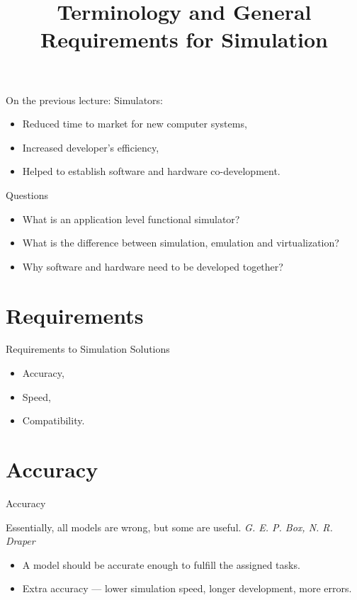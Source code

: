 

\title{Terminology and General Requirements for Simulation}



\startslides

\begin{frame}{On the previous lecture:}
Simulators:
\begin{itemize}
\item Reduced time to market for new computer systems,
\item Increased developer's efficiency,
\item Helped to establish software and hardware co-development.
\end{itemize}
\end{frame}

\begin{frame}{Questions}
\begin{itemize}
\item What is an application level functional simulator?\pause
\item What is the difference between simulation, emulation and virtualization?\pause
\item Why software and hardware need to be developed together?
\end{itemize}
\end{frame}

\section{Requirements}

\begin{frame}{Requirements to Simulation Solutions}
\begin{itemize}
\item Accuracy,
\item Speed,
\item Compatibility.
\end{itemize}
\end{frame}

\section{Accuracy}

\begin{frame}{Accuracy}
\begin{flushright}
\tiny{Essentially, all models are wrong, but some are useful. \textit{G. E. P. Box, N. R. Draper}}
\end{flushright}
\vfill
\begin{itemize}
\item A model should be accurate enough to fulfill the assigned tasks.
\item Extra accuracy --- lower simulation speed, longer development, more errors.
\vfill
\end{itemize}
\end{frame}

